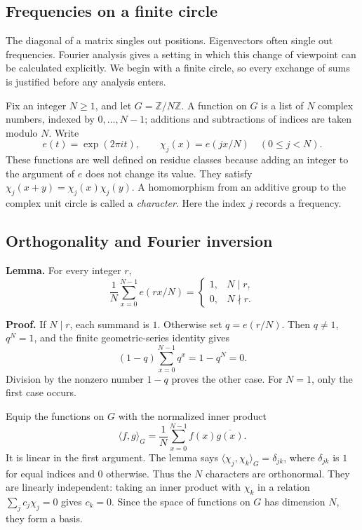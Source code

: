 \subsection{Frequencies on a finite circle}\label{finite-circle-frequencies}

The diagonal of a matrix singles out positions. Eigenvectors often single out frequencies. Fourier analysis gives a setting in which this change of viewpoint can be calculated explicitly. We begin with a finite circle, so every exchange of sums is justified before any analysis enters.

Fix an integer \(N\geq1\), and let \(G=\mathbb Z/N\mathbb Z\). A function on \(G\) is a list of \(N\) complex numbers, indexed by \(0,\ldots,N-1\); additions and subtractions of indices are taken modulo \(N\). Write
\[
e(t)=\exp(2\pi i t),\qquad
\chi_j(x)=e(jx/N)\quad(0\leq j<N).
\]
These functions are well defined on residue classes because adding an integer to the argument of \(e\) does not change its value. They satisfy \(\chi_j(x+y)=\chi_j(x)\chi_j(y)\). A homomorphism from an additive group to the complex unit circle is called a \emph{character}. Here the index \(j\) records a frequency.

\subsection{Orthogonality and Fourier inversion}\label{finite-fourier-inversion}

\textbf{Lemma.} For every integer \(r\),
\[
\frac1N\sum_{x=0}^{N-1}e(rx/N)
=\begin{cases}1,&N\mid r,\\0,&N\nmid r.\end{cases}
\]

\textbf{Proof.} If \(N\mid r\), each summand is \(1\). Otherwise set \(q=e(r/N)\). Then \(q\ne1\), \(q^N=1\), and the finite geometric-series identity gives
\[
(1-q)\sum_{x=0}^{N-1}q^x=1-q^N=0.
\]
Division by the nonzero number \(1-q\) proves the other case. For \(N=1\), only the first case occurs.

Equip the functions on \(G\) with the normalized inner product
\[
\langle f,g\rangle_G=\frac1N\sum_{x=0}^{N-1}f(x)\overline{g(x)}.
\]
It is linear in the first argument. The lemma says
\(\langle\chi_j,\chi_k\rangle_G=\delta_{jk}\), where \(\delta_{jk}\) is \(1\) for equal indices and \(0\) otherwise. Thus the \(N\) characters are orthonormal. They are linearly independent: taking an inner product with \(\chi_k\) in a relation \(\sum_j c_j\chi_j=0\) gives \(c_k=0\). Since the space of functions on \(G\) has dimension \(N\), they form a basis.


